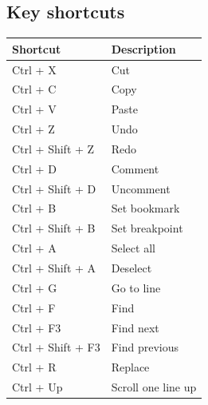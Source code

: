     \subsection{Key shortcuts}
        \begin{table}[h!]
            \centering
            \begin{tabular}{|l|l|}
                \hline
                \textbf{Shortcut}               & \textbf{Description}          \\\hline
                    Ctrl + X                    & Cut                           \\\hline
                    Ctrl + C                    & Copy                          \\\hline
                    Ctrl + V                    & Paste                         \\\hline
                    Ctrl + Z                    & Undo                          \\\hline
                    Ctrl + Shift + Z            & Redo                          \\\hline
                    Ctrl + D                    & Comment                       \\\hline
                    Ctrl + Shift + D            & Uncomment                     \\\hline
                    Ctrl + B                    & Set bookmark                  \\\hline
                    Ctrl + Shift + B            & Set breakpoint                \\\hline
                    Ctrl + A                    & Select all                    \\\hline
                    Ctrl + Shift + A            & Deselect                      \\\hline
                    Ctrl + G                    & Go to line                    \\\hline
                    Ctrl + F                    & Find                          \\\hline
                    Ctrl + F3                   & Find next                     \\\hline
                    Ctrl + Shift + F3           & Find previous                 \\\hline
                    Ctrl + R                    & Replace                       \\\hline
                    Ctrl + Up                   & Scroll one line up            \\\hline

\end{tabular}
\end{table}
